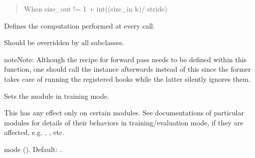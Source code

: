 \documentclass[letterpaper,10pt,english]{sphinxmanual}
\begin{document}
\begin{fulllineitems}
\begin{fulllineitems}
\begin{quote}
\begin{description}
\begin{itemize}
\end{itemize}

\sphinxAtStartPar
{} \textendash{} When size\_out != 1 + int((size\_in \sphinxhyphen{} k)/ stride)

\end{description}\end{quote}

\end{fulllineitems}


\begin{fulllineitems}
\label{\detokenize{MLSCAlib.Architectures:MLSCAlib.Architectures.torch_models.MaskingLayer.forward}}
\pysigstartsignatures
{}
\pysigstopsignatures
\sphinxAtStartPar
Defines the computation performed at every call.

\sphinxAtStartPar
Should be overridden by all subclasses.

\begin{sphinxadmonition}{note}{Note:}
\sphinxAtStartPar
Although the recipe for forward pass needs to be defined within
this function, one should call the  instance afterwards
instead of this since the former takes care of running the
registered hooks while the latter silently ignores them.
\end{sphinxadmonition}

\end{fulllineitems}


\begin{fulllineitems}
\label{\detokenize{MLSCAlib.Architectures:MLSCAlib.Architectures.torch_models.MaskingLayer.train}}
\pysigstartsignatures
{}
\pysigstopsignatures
\sphinxAtStartPar
Sets the module in training mode.

\sphinxAtStartPar
This has any effect only on certain modules. See documentations of
particular modules for details of their behaviors in training/evaluation
mode, if they are affected, e.g. , ,
etc.
\begin{description}
\begin{description}
\sphinxAtStartPar
mode (). Default: .


\end{description}
\end{description}
\end{fulllineitems}
\end{fulllineitems}
\end{document}
